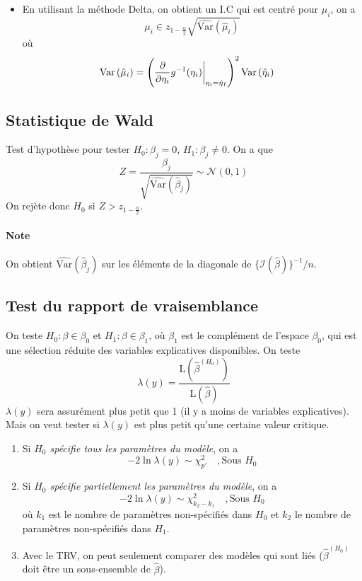 \documentclass[10pt, french]{article}
\begin{document}
\begin{multicols*}{3}
\begin{itemize}
	\item En utilisant la méthode Delta, on obtient un I.C qui est centré pour $\mu_i$, on a
	\[
		\mu_i \in z_{1 - \frac{\alpha}{2}} \sqrt{\widehat{\mathrm{Var}}(\hat{\mu}_i)}  
	\]
	où
	\begin{align*}
	\mathrm{Var} \left( \hat{\mu}_i \right)	
		&= \left( \frac{\partial}{\partial \eta_i} g^{-1}(\eta_i) \biggr \rvert_{\eta_i 
		= \hat{\eta}_I} \right)^2 \mathrm{Var} \left( \hat{\eta}_i \right)
	\end{align*}
\end{itemize}

\subsection*{Statistique de Wald}

Test d'hypothèse pour tester $H_0 : \beta_j = 0$, $H_1 : \beta_j \neq 0$. On a que
	\[
		Z = \frac{\beta_j}{\sqrt{\widehat{\mathrm{Var}}(\hat{\beta}_j)}} \sim \mathcal{N}(0,1) 
	\]
On rejète donc $H_0$ si $Z > z_{1 - \frac{\alpha}{2}}$.

\paragraph{Note} On obtient $\widehat{\mathrm{Var}}(\hat{\beta}_j)$ sur les éléments de la diagonale de $\{ \mathcal{I}(\hat{\beta}) \}^{-1} / n$.

\subsection*{Test du rapport de vraisemblance}
On teste $H_0 : \beta \in \beta_0$ et $H_1 : \beta \in \beta_1$, où $\beta_1$ est le complément de l'espace $\beta_0$, qui est une sélection réduite des variables explicatives disponibles. On teste
\[\lambda(y) = \frac{\mathrm{L}\left(\hat{\beta}^{(H_0)} \right)}{\mathrm{L}(\hat{\beta})}   \]
$\lambda(y)$ sera assurément plus petit que 1 (il y a moins de variables explicatives). Mais on veut tester si $\lambda(y)$ est plus petit qu'une certaine valeur critique.

\begin{enumerate}[label=\faAngleRight]
	\item	Si \emph{$H_0$ spécifie tous les paramètres du modèle}, on a
	\[
		-2 \ln \lambda(y) \sim \chi_{p'}^2 \quad , \text{Sous $H_0$}
	\]
	\item 	Si \emph{$H_0$ spécifie partiellement les paramètres du modèle}, on a
	\[
		-2 \ln \lambda(y) \sim \chi_{k_2 - k_1}^2 \quad , \text{Sous $H_0$}
	\]
	où $k_1$ est le nombre de paramètres non-spécifiés dans $H_0$ et $k_2$ le nombre de paramètres non-spécifiés dans $H_1$.
	\item 	Avec le TRV, on peut seulement comparer des modèles qui sont liés ($\hat{\beta}^{(H_0)}$ doit être un sous-ensemble de $\hat{\beta}$).
\end{enumerate}


\end{multicols*}
\end{document}
